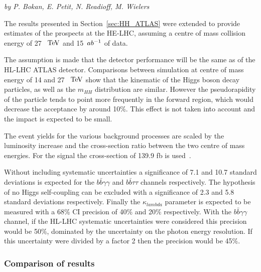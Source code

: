 \begin{center}
\textit{by P. Bokan, E. Petit, N. Readioff, M. Wielers}
\end{center}

The results presented in Section~\ref{sec:HH_ATLAS} were extended to provide estimates of the prospects at the HE-LHC, assuming a centre of mass collision energy of 27~$~\text{TeV}$ and 15~$ab^{-1}$ of data.

The assumption is made that the detector performance will be the same as of the HL-LHC ATLAS detector. Comparisons between simulation at centre of mass energy of 14 and 27~$~\text{TeV}$ show that the kinematic of the Higgs boson decay particles, as well as the $m_{HH}$ distribution are similar. However the pseudorapidity of the particle tends to point more frequently in the forward region, which would decrease the acceptance by around 10\%. This effect is not taken into account and the impact is expected to be small.

The event yields for the various background processes are scaled by the luminosity increase and the cross-section ratio between the two centre of mass energies. For the signal the cross-section of 139.9 fb is used~\cite{Grazzini:2018bsd}.

Without including systematic uncertainties a significance of 7.1 and 10.7 standard deviations is expected for the $b\bar{b}\gamma\gamma$ and $b\bar{b}\tau\tau$ channels respectively.
The hypothesis of no Higgs self-coupling can be excluded with a significance of 2.3 and 5.8 standard deviations respectively. Finally the $\kappa_{lambda}$ parameter is expected to be measured with a 68\% CI precision of 40\% and 20\% respectively.
With the $b\bar{b}\gamma\gamma$ channel, if the HL-LHC systematic uncertainties were considered this precision would be 50\%, dominated by the uncertainty on the photon energy resolution. If this uncertainty were divided by a factor 2 then the precision would be 45\%.



\subsubsection{Comparison of results}

